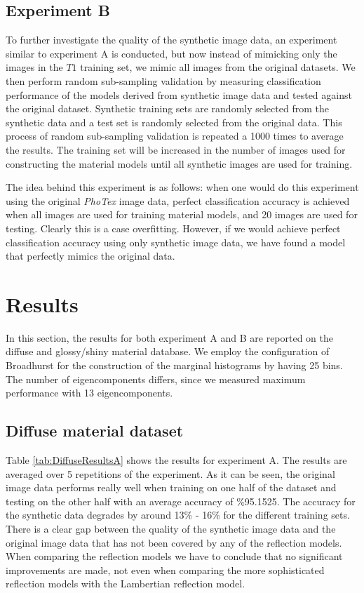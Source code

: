 \subsection{Experiment B}
To further investigate the quality of the synthetic image data, an experiment similar to experiment A is conducted, but now instead of mimicking only the images in the $T1$ training set, we mimic all images from the original datasets. We then perform random sub-sampling validation by measuring classification performance of the models derived from synthetic image data and tested against the original dataset. Synthetic training sets are randomly selected from the synthetic data and a test set is randomly selected from the original data. This process of random sub-sampling validation is repeated a 1000 times to average the results. The training set will be increased in the number of images used for constructing the material models until all synthetic images are used for training. 

The idea behind this experiment is as follows: when one would do this experiment using the original {\it PhoTex} image data, perfect classification accuracy is achieved when all images are used for training material models, and 20 images are used for testing. Clearly this is a case overfitting. However, if we would achieve perfect classification accuracy using only synthetic image data, we have found a model that perfectly mimics the original data. 

\section{Results}\label{sec:Results}
In this section, the results for both experiment A and B are reported on the diffuse and glossy/shiny material database. We employ the configuration of Broadhurst for the construction of the marginal histograms by having 25 bins. The number of eigencomponents differs, since we measured maximum performance with 13 eigencomponents.

\subsection{Diffuse material dataset}
Table \ref{tab:DiffuseResultsA} shows the results for experiment A. The results are averaged over 5 repetitions of the experiment. As it can be seen, the original image data performs really well when training on one half of the dataset and testing on the other half with an average accuracy of \%95.1525. The accuracy for the synthetic data degrades by around 13\% - 16\% for the different training sets. There is a clear gap between the quality of the synthetic image data and the original image data that has not been covered by any of the reflection models. When comparing the reflection models we have to conclude that no significant improvements are made, not even when comparing the more sophisticated reflection models with the Lambertian reflection model. 
 
